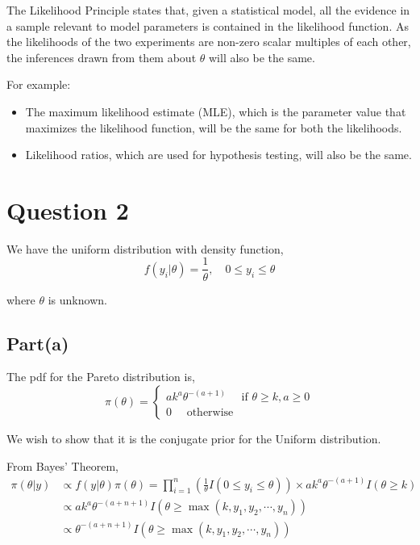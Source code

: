 \documentclass[a4paper]{article}
\begin{document}
The Likelihood Principle states that, given a statistical model, all the evidence in a sample relevant to model parameters is contained in the likelihood function. As the likelihoods of the two experiments are non-zero scalar multiples of each other, the inferences drawn from them about $\theta$ will also be the same.

For example:
\begin{itemize}
    \item The maximum likelihood estimate (MLE), which is the parameter value that maximizes the likelihood function, will be the same for both the likelihoods.
    \item Likelihood ratios, which are used for hypothesis testing, will also be the same.
\end{itemize}

\newpage

\section*{Question 2}

We have the uniform distribution with density function,
\[f(y_i|\theta) = \frac{1}{\theta}, \quad 0 \leq y_i \leq \theta \]

where \(\theta\) is unknown.

\subsection*{Part(a)}

The pdf for the Pareto distribution is,
\[\displaystyle
    \pi(\theta) = \begin{cases}
        a k^{a} \theta^{-(a+1)} \quad \text{ if } \theta \geq k, a \geq 0\\
        0 \quad \text{ otherwise }
    \end{cases}
\]

We wish to show that it is the conjugate prior for the Uniform distribution.

From Bayes' Theorem,
\begin{align*}
    \pi(\theta|y) &\propto f(y|\theta) \pi(\theta) 
                = \prod_{i=1}^{n}\left(\frac{1}{\theta}I(0\leq y_i\leq\theta) \right) \times a k^{a} \theta^{-(a+1)} I(\theta \geq k) \\
     &\propto a k^{a} \theta^{-(a+n+1)} I\left(\theta \geq \max(k,y_1,y_2,\cdots,y_n)\right)\\
     &\propto \theta^{-(a+n+1)}  I\left(\theta \geq \max(k,y_1,y_2,\cdots,y_n)\right)
\end{align*}
\end{document}
